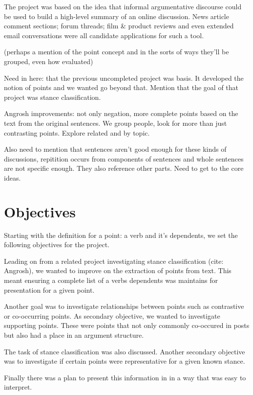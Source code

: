     The project was based on the idea that informal argumentative discourse could be used to build a high-level summary of an online discussion. News article comment sections; forum threads; film \& product reviews and even extended email conversations were all candidate applications for such a tool.

    (perhaps a mention of the point concept and in the sorts of ways they'll be grouped, even how evaluated)

    Need in here: that the previous uncompleted project was basis. It developed the notion of points and we wanted go beyond that. Mention that the goal of that project was stance classification.

    Angrosh improvements: not only negation, more complete points based on the text from the original sentences. We group people, look for more than just contrasting points. Explore related and by topic.

    Also need to mention that sentences aren't good enough for these kinds of discussions, repitition occurs from components of sentences and whole sentences are not specific enough. They also reference other parts. Need to get to the core ideas.

  \section{Objectives}
    Starting with the definition for a point: a verb and it's dependents, we set the following objectives for the project.

    Leading on from a related project investigating stance classification (cite: Angrosh), we wanted to improve on the extraction of points from text. This meant ensuring a complete list of a verbs dependents was maintains for presentation for a given point.

    Another goal was to investigate relationships between points such as contrastive or co-occurring points. As secondary objective, we wanted to investigate supporting points. These were points that not only commonly co-occured in posts but also had a place in an argument structure.

    The task of stance classification was also discussed. Another secondary objective was to investigate if certain points were representative for a given known stance.

    Finally there was a plan to present this information in in a way that was easy to interpret.
